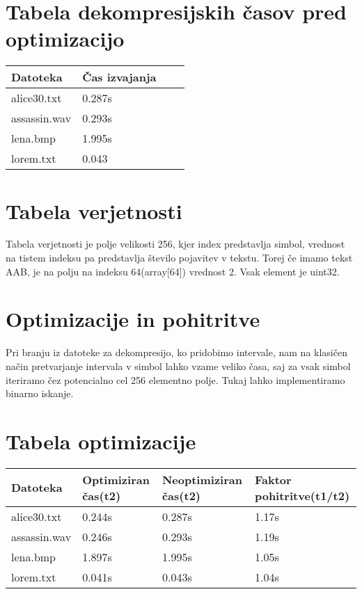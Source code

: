 \documentclass[12pt,a4paper]{article}
\begin{document}
\section{Tabela dekompresijskih časov pred optimizacijo}
\begin{table}[H]
    \begin{tabular}{llll}
    Datoteka     & Čas izvajanja \\ \hline
    alice30.txt  & 0.287s              \\
    assassin.wav & 0.293s                      \\
    lena.bmp     & 1.995s              \\
    lorem.txt    & 0.043                           \\
    \end{tabular}
\end{table}
\section{Tabela verjetnosti}
Tabela verjetnosti je polje velikosti 256, kjer index predstavlja simbol,
vrednost na tistem indeksu pa predstavlja število pojavitev v tekstu. Torej če imamo tekst AAB, je na polju na indeksu 64(array[64]) vrednost 2.
Vsak element je uint32.
\section{Optimizacije in pohitritve}
Pri branju iz datoteke za dekompresijo, ko pridobimo intervale, nam na klasičen način pretvarjanje intervala v simbol lahko vzame veliko časa, saj za vsak simbol iteriramo čez potencialno cel 256 elementno polje. Tukaj lahko implementiramo binarno iskanje.
\section{Tabela optimizacije}

\begin{table}[H]
    \begin{tabular}{llll}
    Datoteka     & Optimiziran čas(t2)     & Neoptimiziran čas(t2) & Faktor pohitritve(t1/t2) \\ \hline
    alice30.txt  & 0.244s  & 0.287s        & 1.17s            \\
    assassin.wav & 0.246s  & 0.293s        & 1.19s       \\
    lena.bmp     & 1.897s  & 1.995s        & 1.05s           \\
    lorem.txt    & 0.041s  & 0.043s        & 1.04s          \\
    \end{tabular}
\end{table}
\end{document}

